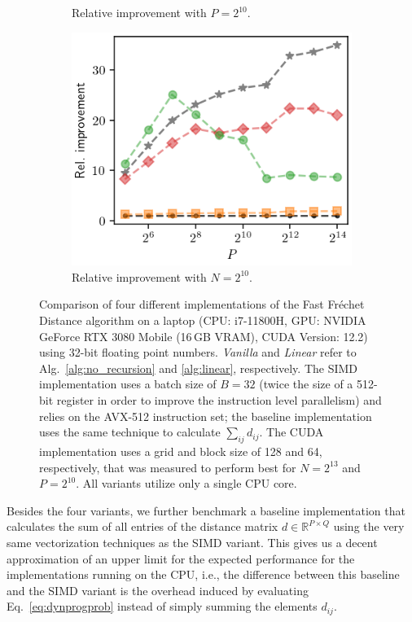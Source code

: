 \begin{figure}[htbp]
\begin{subfigure}{.49\textwidth}
        \caption{Relative improvement with $P = 2^{10}$.}
    \end{subfigure}
    \begin{subfigure}{.49\textwidth}
        \includegraphics[width=.8\textwidth]{img/laptop/rel_performance-pP.png}
        \caption{Relative improvement with $N = 2^{10}$.}
    \end{subfigure}
    \caption{Comparison of four different implementations of the Fast Fr\'echet Distance algorithm on a laptop (CPU: i7-11800H, GPU: NVIDIA GeForce RTX 3080 Mobile (16\,GB VRAM), CUDA Version: 12.2) using 32-bit floating point numbers. \textit{Vanilla} and \textit{Linear} refer to Alg.~\ref{alg:no_recursion} and \ref{alg:linear}, respectively. The SIMD implementation uses a batch size of $B = 32$ (twice the size of a 512-bit register in order to improve the instruction level parallelism) and relies on the AVX-512 instruction set; the baseline implementation uses the same technique to calculate $\sum_{ij} d_{ij}$. The CUDA implementation uses a grid and block size of 128 and 64, respectively, that was measured to perform best for $N=2^{13}$ and $P=2^{10}$. All variants utilize only a single CPU core.}
    \label{fig:benchmark_laptop}
\end{figure}

Besides the four variants, we further benchmark a baseline implementation that calculates the sum of all entries of the distance matrix $d \in \mathbb{R}^{P \times Q}$ using the very same vectorization techniques as the SIMD variant.
This gives us a decent approximation of an upper limit for the expected performance for the implementations running on the CPU, i.e., the difference between this baseline and the SIMD variant is the overhead induced by evaluating Eq.~\eqref{eq:dynprogprob} instead of simply summing the elements $d_{ij}$.

